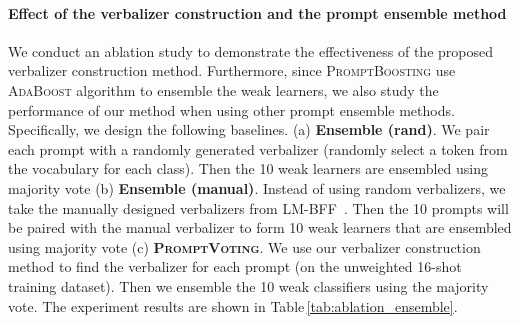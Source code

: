 \documentclass{article}
\theoremstyle{plain}
\theoremstyle{definition}
\theoremstyle{remark}
\newcommand{\alg}{\textsc{PromptBoosting}}
\begin{document}
\paragraph{Effect of the verbalizer construction and the prompt ensemble method}
We conduct an ablation study to demonstrate the effectiveness of the proposed verbalizer construction method. Furthermore, since {\alg} use \textsc{AdaBoost} algorithm to ensemble the weak learners, we also study the performance of our method when using other prompt ensemble methods. Specifically, we design the following baselines. (a) \textbf{Ensemble (rand)}. We pair each prompt with a randomly generated verbalizer (randomly select a token from the vocabulary for each class). Then the 10 weak learners are ensembled using majority vote (b) \textbf{Ensemble (manual)}. Instead of using random verbalizers, we take the manually designed verbalizers from LM-BFF~\citep{gao2021making}. Then the 10 prompts will be paired with the manual verbalizer to form 10 weak learners that are ensembled using majority vote (c) \textbf{\textsc{PromptVoting}}. We use our verbalizer construction method to find the verbalizer for each prompt (on the unweighted 16-shot training dataset). Then we ensemble the 10 weak classifiers using the majority vote. The experiment results are shown in Table\,\ref{tab:ablation_ensemble}.
\end{document}
